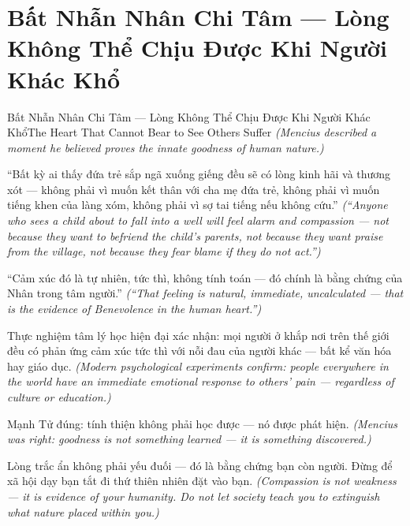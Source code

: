 \section{Bất Nhẫn Nhân Chi Tâm — Lòng Không Thể Chịu Được Khi Người Khác Khổ}
\begin{truyen}{Bất Nhẫn Nhân Chi Tâm — Lòng Không Thể Chịu Được Khi Người Khác Khổ}{The Heart That Cannot Bear to See Others Suffer}
\textit{(Mencius described a moment he believed proves the innate goodness of human nature.)}

``Bất kỳ ai thấy đứa trẻ sắp ngã xuống giếng đều sẽ có lòng kinh hãi và thương xót — không phải vì muốn kết thân với cha mẹ đứa trẻ, không phải vì muốn tiếng khen của làng xóm, không phải vì sợ tai tiếng nếu không cứu.''
\textit{(``Anyone who sees a child about to fall into a well will feel alarm and compassion — not because they want to befriend the child's parents, not because they want praise from the village, not because they fear blame if they do not act.'')}

``Cảm xúc đó là tự nhiên, tức thì, không tính toán — đó chính là bằng chứng của Nhân trong tâm người.''
\textit{(``That feeling is natural, immediate, uncalculated — that is the evidence of Benevolence in the human heart.'')}

Thực nghiệm tâm lý học hiện đại xác nhận: mọi người ở khắp nơi trên thế giới đều có phản ứng cảm xúc tức thì với nỗi đau của người khác — bất kể văn hóa hay giáo dục.
\textit{(Modern psychological experiments confirm: people everywhere in the world have an immediate emotional response to others' pain — regardless of culture or education.)}

Mạnh Tử đúng: tính thiện không phải học được — nó được phát hiện.
\textit{(Mencius was right: goodness is not something learned — it is something discovered.)}

\end{truyen}

\begin{baihoc}
Lòng trắc ẩn không phải yếu đuối — đó là bằng chứng bạn còn người. Đừng để xã hội dạy bạn tắt đi thứ thiên nhiên đặt vào bạn.
\textit{(Compassion is not weakness — it is evidence of your humanity. Do not let society teach you to extinguish what nature placed within you.)}
\end{baihoc}
